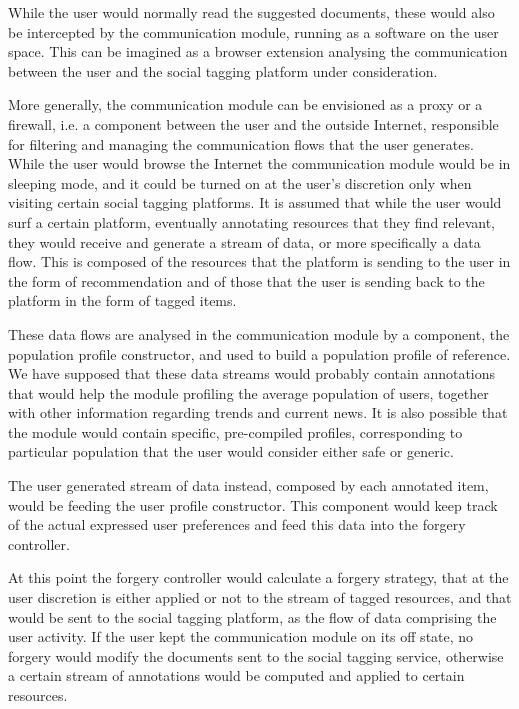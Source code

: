 While the user would normally read the suggested documents, these would also be intercepted by the communication module, running as a software on the user space. This can be imagined as a browser extension analysing the communication between the user and the social tagging platform under consideration.

More generally, the communication module can be envisioned as a proxy or a firewall, i.e. a component between the user and the outside Internet, responsible for filtering and managing the communication flows that the user generates. While the user would browse the Internet the communication module would be in sleeping mode, and it could be turned on at the user's discretion only when visiting certain social tagging platforms. It is assumed that while the user would surf a certain platform, eventually annotating resources that they find relevant, they would receive and generate a stream of data, or more specifically a data flow. This is composed of the resources that the platform is sending to the user in the form of recommendation and of those that the user is sending back to the platform in the form of tagged items.

These data flows are analysed in the communication module by a component, the population profile constructor, and used to build a population profile of reference. We have supposed that these data streams would probably contain annotations that would help the module profiling the average population of users, together with other information regarding trends and current news. It is also possible that the module would contain specific, pre-compiled profiles, corresponding to particular population that the user would consider either safe or generic.

The user generated stream of data instead, composed by each annotated item, would be feeding the user profile constructor. This component would keep track of the actual expressed user preferences and feed this data into the forgery controller.

At this point the forgery controller would calculate a forgery strategy, that at the user discretion is either applied or not to the stream of tagged resources, and that would be sent to the social tagging platform, as the flow of data comprising the user activity. If the user kept the communication module on its off state, no forgery would modify the documents sent to the social tagging service, otherwise a certain stream of annotations would be computed and applied to certain resources.

